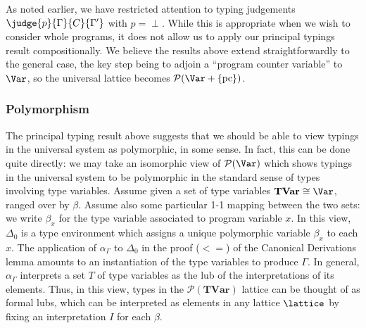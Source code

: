 \documentclass{sigplanconf}
\newcommand{\pset}{\mathcal{P}}
\newcommand{\setName}[1]{\mathrm{\mathbf{#1}}}
\newcommand{\TVar}{\setName{TVar}}
\begin{document}
As noted earlier, we have restricted attention to typing judgements
$\judge{p}{\Gamma}{C}{\Gamma'}$ with $p = \perp$. While this is appropriate
when we wish to consider whole programs, it does not allow us to apply
our principal typings result compositionally. We believe the results above
extend straightforwardly to the general case, the key step being to
adjoin a ``program counter variable'' to $\Var$, so the universal lattice
becomes $\pset(\Var + \{ \mathrm{pc} \})$.

\subsubsection{Polymorphism}\label{sect:polymorphism}
The principal typing result above suggests that we should be able to view
typings in the universal system as polymorphic, in some sense.
In fact, this can be done quite directly:
we may take an isomorphic view of $\pset(\Var)$
which shows typings in the universal system to be polymorphic in the standard
sense of types involving type variables.
Assume given a set of type variables $\TVar \cong \Var$, ranged over by $\beta$.
Assume also some particular 1-1 mapping between the two sets: we write
$\beta_x$ for the type variable associated to program variable $x$.
In this view, $\Delta_0$ is a type environment which assigns a unique polymorphic
variable $\beta_x$ to each $x$.
The application of $\alpha_\Gamma$ to $\Delta_0$ in the proof
($<=$) of the Canonical Derivations lemma amounts to an
instantiation of the type variables to produce $\Gamma$.
In general, $\alpha_\Gamma$ interprets a set $T$ of type
variables as the lub of the interpretations of its elements.
Thus, in this view, types in the $\pset(\TVar)$ lattice can be thought
of as formal lubs, which can be interpreted as elements in any lattice
$\lattice$ by fixing an interpretation $I$ for each $\beta$.
\end{document}
